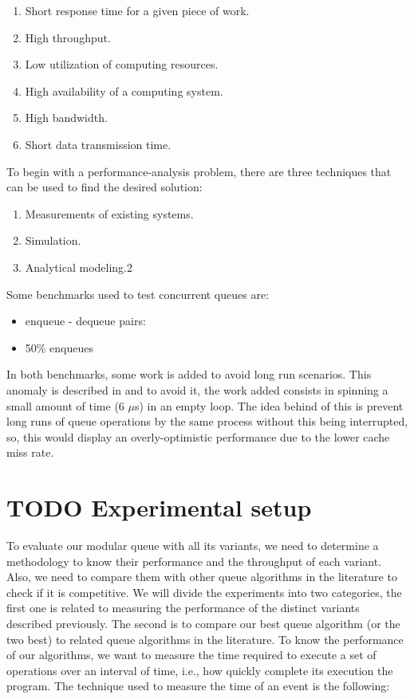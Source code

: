 \documentclass{latex/classes/thesis}
\begin{document}
\begin{enumerate}
\item Short response time for a given piece of work.
\item High throughput.
\item Low utilization of computing resources.
\item High availability of a computing system.
\item High bandwidth.
\item Short data transmission time.
\end{enumerate}

To begin with a performance-analysis problem, there are three techniques
that can be used to find the desired solution:

\begin{enumerate}
\item Measurements of existing systems.
\item Simulation.
\item Analytical modeling.2
\end{enumerate}

Some benchmarks used to test concurrent queues are:

\begin{itemize}
\item enqueue - dequeue pairs:
\item 50\% enqueues
\end{itemize}

In both benchmarks, some work is added to avoid long run scenarios. This
anomaly is described in \cite{DBLP_conf_podc_MichaelS96} and to avoid it, the
work added consists in spinning a small amount of time (6 \(\mu\)s) in an
empty loop. The idea behind of this is prevent long runs of queue operations
by the same process without this being interrupted, so, this would display
an overly-optimistic performance due to the lower cache miss rate.

\section{{\bfseries\sffamily TODO} Experimental setup}
\label{sec:org2e99fa1}

To evaluate our modular queue with all its variants, we need to determine a
methodology to know their performance and the throughput of each
variant. Also, we need to compare them with other queue algorithms in the
literature to check if it is competitive. We will divide the experiments into
two categories, the first one is related to measuring the performance of the
distinct variants described previously. The second is to compare our best
queue algorithm (or the two best) to related queue algorithms in the
literature. To know the performance of our algorithms, we want to measure the
time required to execute a set of operations over an interval of time, i.e.,
how quickly complete its execution the program. The technique used to measure
the time of an event is the following:
\end{document}
